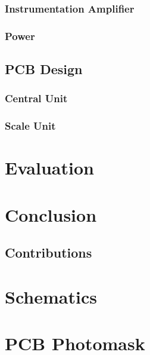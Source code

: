 \documentclass{l3proj}
\begin{document}
\subsection{Instrumentation Amplifier}
\label{ina}


\subsection{Power}


\section{PCB Design}
\label{pcb}


\subsection{Central Unit}

%

\subsection{Scale Unit}

%
\chapter{Evaluation}

\chapter{Conclusion}


\section{Contributions}



\newpage
\appendix
\chapter{Schematics}
\chapter{PCB Photomask}




\end{document}
